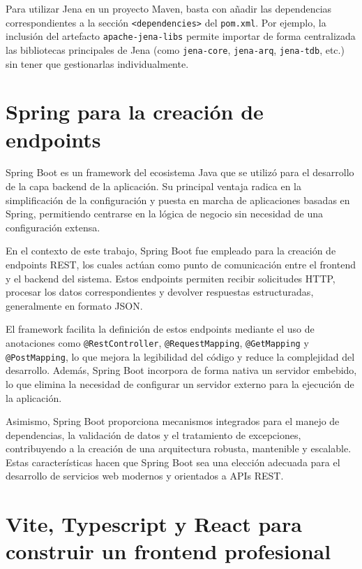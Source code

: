 \documentclass{article}
\begin{document}
Para utilizar Jena en un proyecto Maven, basta con añadir las dependencias correspondientes a la sección \texttt{<dependencies>} del \texttt{pom.xml}. Por ejemplo, la inclusión del artefacto \texttt{apache-jena-libs} permite importar de forma centralizada las bibliotecas principales de Jena (como \texttt{jena-core}, \texttt{jena-arq}, \texttt{jena-tdb}, etc.) sin tener que gestionarlas individualmente.

\section{Spring para la creación de endpoints}

Spring Boot es un framework del ecosistema Java que se utilizó para el desarrollo de la capa backend de la aplicación. Su principal ventaja radica en la simplificación de la configuración y puesta en marcha de aplicaciones basadas en Spring, permitiendo centrarse en la lógica de negocio sin necesidad de una configuración extensa.

En el contexto de este trabajo, Spring Boot fue empleado para la creación de endpoints REST, los cuales actúan como punto de comunicación entre el frontend y el backend del sistema. Estos endpoints permiten recibir solicitudes HTTP, procesar los datos correspondientes y devolver respuestas estructuradas, generalmente en formato JSON.

El framework facilita la definición de estos endpoints mediante el uso de anotaciones como \texttt{@RestController}, \texttt{@RequestMapping}, \texttt{@GetMapping} y \texttt{@PostMapping}, lo que mejora la legibilidad del código y reduce la complejidad del desarrollo. Además, Spring Boot incorpora de forma nativa un servidor embebido, lo que elimina la necesidad de configurar un servidor externo para la ejecución de la aplicación.

Asimismo, Spring Boot proporciona mecanismos integrados para el manejo de dependencias, la validación de datos y el tratamiento de excepciones, contribuyendo a la creación de una arquitectura robusta, mantenible y escalable. Estas características hacen que Spring Boot sea una elección adecuada para el desarrollo de servicios web modernos y orientados a APIs REST.

\section{Vite, Typescript y React para construir un frontend profesional}
\end{document}
